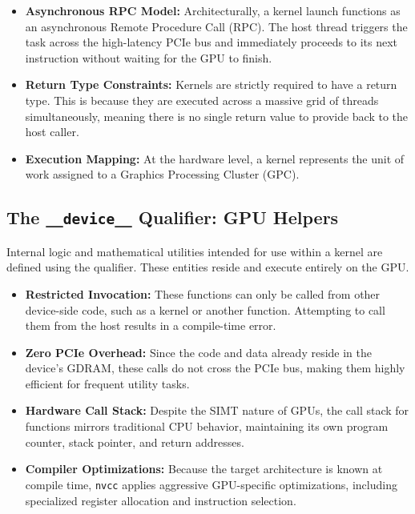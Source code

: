 \begin{itemize}
    \item \textbf{Asynchronous RPC Model:} Architecturally, a kernel launch functions as an asynchronous Remote Procedure Call (RPC). The host thread triggers the task across the high-latency PCIe bus and immediately proceeds to its next instruction without waiting for the GPU to finish.
    \item \textbf{Return Type Constraints:} Kernels are strictly required to have a  return type. This is because they are executed across a massive grid of threads simultaneously, meaning there is no single return value to provide back to the host caller.
    \item \textbf{Execution Mapping:} At the hardware level, a kernel represents the unit of work assigned to a Graphics Processing Cluster (GPC).
\end{itemize}

\subsection{The \texttt{\_\_device\_\_} Qualifier: GPU Helpers}

Internal logic and mathematical utilities intended for use within a kernel are defined using the  qualifier. These entities reside and execute entirely on the GPU.

\begin{itemize}
    \item \textbf{Restricted Invocation:} These functions can only be called from other device-side code, such as a  kernel or another  function. Attempting to call them from the host results in a compile-time error.
    \item \textbf{Zero PCIe Overhead:} Since the code and data already reside in the device's GDRAM, these calls do not cross the PCIe bus, making them highly efficient for frequent utility tasks.
    \item \textbf{Hardware Call Stack:} Despite the SIMT nature of GPUs, the call stack for  functions mirrors traditional CPU behavior, maintaining its own program counter, stack pointer, and return addresses.
    \item \textbf{Compiler Optimizations:} Because the target architecture is known at compile time, \texttt{nvcc} applies aggressive GPU-specific optimizations, including specialized register allocation and instruction selection.
\end{itemize}

